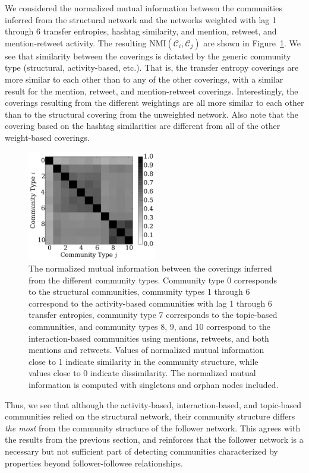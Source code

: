We considered the normalized mutual information between the communities inferred from the structural network and the networks weighted with lag 1 through 6 transfer entropies, hashtag similarity, and mention, retweet, and mention-retweet activity. The resulting $\text{NMI}(\mathcal{C}_{i}, \mathcal{C}_{j})$ are shown in Figure~\ref{Fig-compare_coverings}. We see that similarity between the coverings is dictated by the generic community type (structural, activity-based, etc.). That is, the transfer entropy coverings are more similar to each other than to any of the other coverings, with a similar result for the mention, retweet, and mention-retweet coverings. Interestingly, the coverings resulting from the different weightings are all more similar to each other than to the structural covering from the unweighted network. Also note that the covering based on the hashtag similarities are different from all of the other weight-based coverings.

\begin{figure}[ht]
  \centering
\includegraphics[width=0.50\textwidth]{nmi_singletons.pdf}
\caption{The normalized mutual information between the coverings inferred from the different community types. Community type 0 corresponds to the structural communities, community types 1 through 6 correspond to the activity-based communities with lag 1 through 6 transfer entropies, community type 7 corresponds to the topic-based communities, and community types 8, 9, and 10 correspond to the interaction-based communities using mentions, retweets, and both mentions and retweets. Values of normalized mutual information close to 1 indicate similarity in the community structure, while values close to 0 indicate dissimilarity. The normalized mutual information is computed with singletons and orphan nodes included.}
\label{Fig-compare_coverings}
\end{figure}

Thus, we see that although the activity-based, interaction-based, and topic-based communities relied on the structural network, their community structure differs \emph{the most} from the community structure of the follower network. This agrees with the results from the previous section, and reinforces that the follower network is a necessary but not sufficient part of detecting communities characterized by properties beyond follower-followee relationships.

